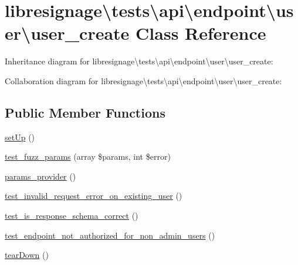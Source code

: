 \hypertarget{classlibresignage_1_1tests_1_1api_1_1endpoint_1_1user_1_1user__create}{}\section{libresignage\textbackslash{}tests\textbackslash{}api\textbackslash{}endpoint\textbackslash{}user\textbackslash{}user\+\_\+create Class Reference}
\label{classlibresignage_1_1tests_1_1api_1_1endpoint_1_1user_1_1user__create}


Inheritance diagram for libresignage\textbackslash{}tests\textbackslash{}api\textbackslash{}endpoint\textbackslash{}user\textbackslash{}user\+\_\+create\+:


Collaboration diagram for libresignage\textbackslash{}tests\textbackslash{}api\textbackslash{}endpoint\textbackslash{}user\textbackslash{}user\+\_\+create\+:
\subsection*{Public Member Functions}
\begin{DoxyCompactItemize}
\item 
\hyperlink{classlibresignage_1_1tests_1_1api_1_1endpoint_1_1user_1_1user__create_a00f254bf940a6d15afb65630843d3dbe}{set\+Up} ()
\item 
\hyperlink{classlibresignage_1_1tests_1_1api_1_1endpoint_1_1user_1_1user__create_aad7c714c653e387ae0959718464d9615}{test\+\_\+fuzz\+\_\+params} (array \$params, int \$error)
\item 
\hyperlink{classlibresignage_1_1tests_1_1api_1_1endpoint_1_1user_1_1user__create_a8fc8662959cde03812fd4a0a7f7c331f}{params\+\_\+provider} ()
\item 
\hyperlink{classlibresignage_1_1tests_1_1api_1_1endpoint_1_1user_1_1user__create_a47e3ddb50f0426aea9c0ad0b4f387a4a}{test\+\_\+invalid\+\_\+request\+\_\+error\+\_\+on\+\_\+existing\+\_\+user} ()
\item 
\hyperlink{classlibresignage_1_1tests_1_1api_1_1endpoint_1_1user_1_1user__create_af6622c798a88d311a38ed20698a665db}{test\+\_\+is\+\_\+response\+\_\+schema\+\_\+correct} ()
\item 
\hyperlink{classlibresignage_1_1tests_1_1api_1_1endpoint_1_1user_1_1user__create_a0ff1ff10b68aadba007177403786aa83}{test\+\_\+endpoint\+\_\+not\+\_\+authorized\+\_\+for\+\_\+non\+\_\+admin\+\_\+users} ()
\item 
\hyperlink{classlibresignage_1_1tests_1_1api_1_1endpoint_1_1user_1_1user__create_a00c4d6a9d0d0eb83ebb5e0e39297da67}{tear\+Down} ()
\end{DoxyCompactItemize}
